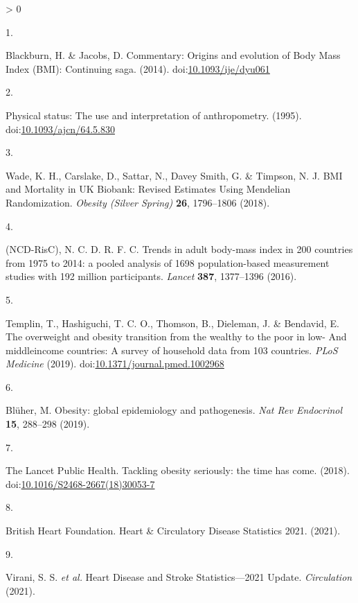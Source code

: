 \documentclass[11pt,twoside]{bristolthesis}
\newlength{\cslhangindent}
\newlength{\csllabelwidth}
\newenvironment{CSLReferences}[2] %
 {%
  \setlength{\parindent}{0pt}
  \ifodd #1 \everypar{\setlength{\hangindent}{\cslhangindent}}\ignorespaces\fi
  \ifnum #2 > 0
  \setlength{\parskip}{#2\baselineskip}
  \fi
 }%
 {}
\newcommand{\CSLLeftMargin}[1]{\parbox[t]{\csllabelwidth}{#1}}
\newcommand{\CSLRightInline}[1]{\parbox[t]{\linewidth - \csllabelwidth}{#1}\break}
\begin{document}
\hypertarget{refs}{}
\begin{CSLReferences}{0}{0}
\leavevmode\hypertarget{ref-Blackburn2014}{}%
\CSLLeftMargin{1. }
\CSLRightInline{Blackburn, H. \& Jacobs, D. {Commentary: Origins and evolution of Body Mass Index (BMI): Continuing saga}. (2014). doi:\href{https://doi.org/10.1093/ije/dyu061}{10.1093/ije/dyu061}}

\leavevmode\hypertarget{ref-WHO1995}{}%
\CSLLeftMargin{2. }
\CSLRightInline{{Physical status: The use and interpretation of anthropometry}. (1995). doi:\href{https://doi.org/10.1093/ajcn/64.5.830}{10.1093/ajcn/64.5.830}}

\leavevmode\hypertarget{ref-Wade2018}{}%
\CSLLeftMargin{3. }
\CSLRightInline{Wade, K. H., Carslake, D., Sattar, N., Davey Smith, G. \& Timpson, N. J. {BMI and Mortality in UK Biobank: Revised Estimates Using Mendelian Randomization}. \emph{Obesity (Silver Spring)} \textbf{26}, 1796--1806 (2018).}

\leavevmode\hypertarget{ref-NCD-RisC2016}{}%
\CSLLeftMargin{4. }
\CSLRightInline{(NCD-RisC), N. C. D. R. F. C. {Trends in adult body-mass index in 200 countries from 1975 to 2014: a pooled analysis of 1698 population-based measurement studies with 19{{}}2 million participants}. \emph{Lancet} \textbf{387}, 1377--1396 (2016).}

\leavevmode\hypertarget{ref-Templin2019}{}%
\CSLLeftMargin{5. }
\CSLRightInline{Templin, T., Hashiguchi, T. C. O., Thomson, B., Dieleman, J. \& Bendavid, E. {The overweight and obesity transition from the wealthy to the poor in low- And middleincome countries: A survey of household data from 103 countries}. \emph{PLoS Medicine} (2019). doi:\href{https://doi.org/10.1371/journal.pmed.1002968}{10.1371/journal.pmed.1002968}}

\leavevmode\hypertarget{ref-Bluher2019}{}%
\CSLLeftMargin{6. }
\CSLRightInline{Blüher, M. {Obesity: global epidemiology and pathogenesis}. \emph{Nat Rev Endocrinol} \textbf{15}, 288--298 (2019).}

\leavevmode\hypertarget{ref-TheLancetPublicHealth2018}{}%
\CSLLeftMargin{7. }
\CSLRightInline{The Lancet Public Health. {Tackling obesity seriously: the time has come}. (2018). doi:\href{https://doi.org/10.1016/S2468-2667(18)30053-7}{10.1016/S2468-2667(18)30053-7}}

\leavevmode\hypertarget{ref-BritishHeartFoundation2021}{}%
\CSLLeftMargin{8. }
\CSLRightInline{British Heart Foundation. {Heart {\&} Circulatory Disease Statistics 2021}. (2021).}

\leavevmode\hypertarget{ref-Virani2021}{}%
\CSLLeftMargin{9. }
\CSLRightInline{Virani, S. S. \emph{et al.} {Heart Disease and Stroke Statistics---2021 Update}. \emph{Circulation} (2021).}


\end{CSLReferences}
\end{document}
